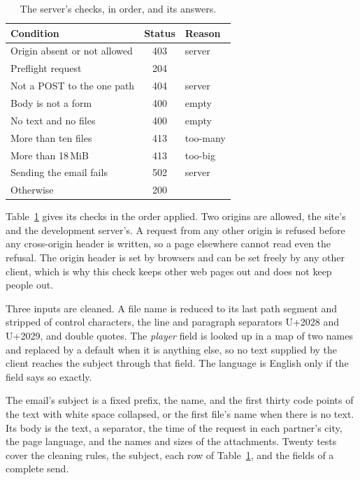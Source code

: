 \documentclass[sigconf,nonacm]{acmart}
\begin{document}
\begin{table}[t]
  \caption{The server's checks, in order, and its answers.}
  \label{tab:worker}
  \small
  \begin{tabular}{@{}p{}cl@{}}
    \toprule
    Condition & Status & Reason \\
    \midrule
    Origin absent or not allowed & 403 & server \\
    Preflight request & 204 & \\
    Not a POST to the one path & 404 & server \\
    Body is not a form & 400 & empty \\
    No text and no files & 400 & empty \\
    More than ten files & 413 & too-many \\
    More than 18\,MiB & 413 & too-big \\
    Sending the email fails & 502 & server \\
    Otherwise & 200 & \\
    \bottomrule
  \end{tabular}
\end{table}

Table~\ref{tab:worker} gives its checks in the order applied. Two origins are allowed, the
site's and the development server's. A request from any other origin is refused before any
cross-origin header is written, so a page elsewhere cannot read even the refusal. The origin
header is set by browsers and can be set freely by any other client, which is why this check
keeps other web pages out and does not keep people out.

Three inputs are cleaned. A file name is reduced to its last path segment and stripped of
control characters, the line and paragraph separators U+2028 and U+2029, and double quotes.
The \emph{player} field is looked up in a map of two names and replaced by a default when it
is anything else, so no text supplied by the client reaches the subject through that field.
The language is English only if the field says so exactly.

The email's subject is a fixed prefix, the name, and the first thirty code points of the text
with white space collapsed, or the first file's name when there is no text. Its body is the
text, a separator, the time of the request in each partner's city, the page language, and the
names and sizes of the attachments. Twenty tests cover the cleaning rules, the subject, each
row of Table~\ref{tab:worker}, and the fields of a complete send.
\end{document}

